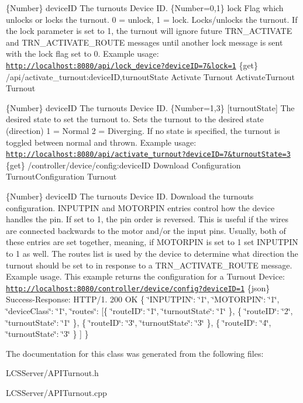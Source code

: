 \{Number\} device\+ID The turnout\textquotesingle{}s Device ID.  \{Number=0,1\} lock Flag which unlocks or locks the turnout. 0 = unlock, 1 = lock.  Locks/unlocks the turnout. If the lock parameter is set to 1, the turnout will ignore future T\+R\+N\+\_\+\+A\+C\+T\+I\+V\+A\+TE and T\+R\+N\+\_\+\+A\+C\+T\+I\+V\+A\+T\+E\+\_\+\+R\+O\+U\+TE messages until another lock message is sent with the lock flag set to 0.  Example usage\+: \href{http://localhost:8080/api/lock_device?deviceID=7&lock=1}{\tt http\+://localhost\+:8080/api/lock\+\_\+device?device\+I\+D=7\&lock=1}  \{get\} /api/activate\+\_\+turnout\+:device\+ID,turnout\+State Activate Turnout  Activate\+Turnout  Turnout

\{Number\} device\+ID The turnout\textquotesingle{}s Device ID.  \{Number=1,3\} \mbox{[}turnout\+State\mbox{]} The desired state to set the turnout to.  Sets the turnout to the desired state (direction) 1 = Normal 2 = Diverging. If no state is specified, the turnout is toggled between normal and thrown.  Example usage\+: \href{http://localhost:8080/api/activate_turnout?deviceID=7&turnoutState=3}{\tt http\+://localhost\+:8080/api/activate\+\_\+turnout?device\+I\+D=7\&turnout\+State=3}  \{get\} /controller/device/config\+:device\+ID Download Configuration  Turnout\+Configuration  Turnout

\{Number\} device\+ID The turnout\textquotesingle{}s Device ID.  Download the turnout\textquotesingle{}s configuration. I\+N\+P\+U\+T\+P\+IN and M\+O\+T\+O\+R\+P\+IN entries control how the device handles the pin. If set to 1, the pin order is reversed. This is useful if the wires are connected backwards to the motor and/or the input pins. Usually, both of these entries are set together, meaning, if M\+O\+T\+O\+R\+P\+IN is set to 1 set I\+N\+P\+U\+T\+P\+IN to 1 as well. The routes list is used by the device to determine what direction the turnout should be set to in response to a T\+R\+N\+\_\+\+A\+C\+T\+I\+V\+A\+T\+E\+\_\+\+R\+O\+U\+TE message.  Example usage. This example returns the configuration for a Turnout Device\+: \href{http://localhost:8080/controller/device/config?deviceID=1}{\tt http\+://localhost\+:8080/controller/device/config?device\+I\+D=1}  \{json\} Success-\/\+Response\+: H\+T\+T\+P/1. 200 OK \{ \char`\"{}\+I\+N\+P\+U\+T\+P\+I\+N\char`\"{}\+: \char`\"{}1\char`\"{}, \char`\"{}\+M\+O\+T\+O\+R\+P\+I\+N\char`\"{}\+: \char`\"{}1\char`\"{}, \char`\"{}device\+Class\char`\"{}\+: \char`\"{}1\char`\"{}, \char`\"{}routes\char`\"{}\+: \mbox{[}\{ \char`\"{}route\+I\+D\char`\"{}\+: \char`\"{}1\char`\"{}, \char`\"{}turnout\+State\char`\"{}\+: \char`\"{}1\char`\"{} \}, \{ \char`\"{}route\+I\+D\char`\"{}\+: \char`\"{}2\char`\"{}, \char`\"{}turnout\+State\char`\"{}\+: \char`\"{}1\char`\"{} \}, \{ \char`\"{}route\+I\+D\char`\"{}\+: \char`\"{}3\char`\"{}, \char`\"{}turnout\+State\char`\"{}\+: \char`\"{}3\char`\"{} \}, \{ \char`\"{}route\+I\+D\char`\"{}\+: \char`\"{}4\char`\"{}, \char`\"{}turnout\+State\char`\"{}\+: \char`\"{}3\char`\"{} \} \mbox{]} \} 

The documentation for this class was generated from the following files\+:\begin{DoxyCompactItemize}
\item 
L\+C\+S\+Server/A\+P\+I\+Turnout.\+h\item 
L\+C\+S\+Server/A\+P\+I\+Turnout.\+cpp\end{DoxyCompactItemize}
